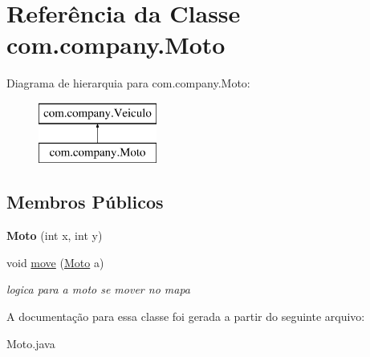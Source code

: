 \hypertarget{classcom_1_1company_1_1_moto}{}\section{Referência da Classe com.\+company.\+Moto}
\label{classcom_1_1company_1_1_moto}
Diagrama de hierarquia para com.\+company.\+Moto\+:\begin{figure}[H]
\begin{center}
\leavevmode
\includegraphics[height=2.000000cm]{classcom_1_1company_1_1_moto}
\end{center}
\end{figure}
\subsection*{Membros Públicos}
\begin{DoxyCompactItemize}
\item 
\mbox{\label{classcom_1_1company_1_1_moto_a515d5ceb54df30829f64bec34f052d38}} 
{\bfseries Moto} (int x, int y)
\item 
\mbox{\label{classcom_1_1company_1_1_moto_a6dd391cc77dd0cac8fc670a5b93e4b0d}} 
void \mbox{\hyperlink{classcom_1_1company_1_1_moto_a6dd391cc77dd0cac8fc670a5b93e4b0d}{move}} (\mbox{\hyperlink{classcom_1_1company_1_1_moto}{Moto}} a)
\begin{DoxyCompactList}\small\item\em logica para a moto se mover no mapa \end{DoxyCompactList}\end{DoxyCompactItemize}


A documentação para essa classe foi gerada a partir do seguinte arquivo\+:\begin{DoxyCompactItemize}
\item 
Moto.\+java\end{DoxyCompactItemize}
